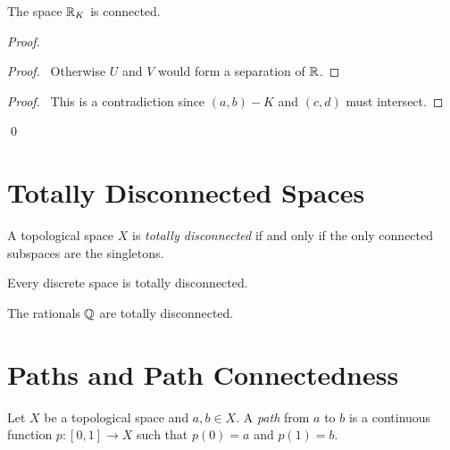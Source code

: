 \begin{example}
    The space $\mathbb{R}_K$ is connected.
\end{example}

\begin{proof}
    \pf
    \begin{proof}
        \pf\ Otherwise $U$ and $V$ would form a separation of $\mathbb{R}$.
    \end{proof}
    \qedstep
    \begin{proof}
        \pf\ This is a contradiction since $(a,b) - K$ and $(c,d)$ must intersect.
    \end{proof}
    \qed
\end{proof}

\section{Totally Disconnected Spaces}

\begin{definition}
    A topological space $X$ is \emph{totally disconnected} if and only if the only connected subspaces are the singletons.
\end{definition}

\begin{example}
    Every discrete space is totally disconnected.
\end{example}

\begin{example}
    The rationals $\mathbb{Q}$ are totally disconnected.
\end{example}

\section{Paths and Path Connectedness}

\begin{definition}[Path]
    Let $X$ be a topological space and $a, b \in X$. A \emph{path} from $a$ to $b$ is a continuous function $p : [0,1] \rightarrow X$
    such that $p(0) = a$ and $p(1) = b$.
\end{definition}

